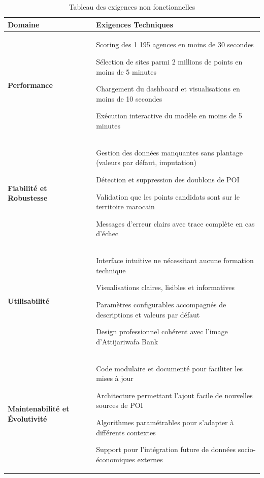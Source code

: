 \documentclass[11pt,a4paper,twoside]{report}
\begin{document}
\begingroup
\small
\renewcommand{\arraystretch}{1.1}
\begin{longtable}{|p{3.2cm}|p{10.8cm}|}
\caption{Tableau des exigences non fonctionnelles} \label{tab:enf} \\
\hline
\textbf{Domaine} & \textbf{Exigences Techniques} \\
\hline
\endfirsthead
\endhead
\hline
\endfoot
\hline
\endlastfoot

\textbf{Performance} &
\begin{tblitem}
    \item Scoring des 1 195 agences en moins de 30 secondes
    \item Sélection de sites parmi 2 millions de points en moins de 5 minutes
    \item Chargement du dashboard et visualisations en moins de 10 secondes
    \item Exécution interactive du modèle en moins de 5 minutes
\end{tblitem} \\
\hline

\textbf{Fiabilité et Robustesse} &
\begin{tblitem}
    \item Gestion des données manquantes sans plantage (valeurs par défaut, imputation)
    \item Détection et suppression des doublons de POI
    \item Validation que les points candidats sont sur le territoire marocain
    \item Messages d'erreur clairs avec trace complète en cas d'échec
\end{tblitem} \\
\hline

\textbf{Utilisabilité} &
\begin{tblitem}
    \item Interface intuitive ne nécessitant aucune formation technique
    \item Visualisations claires, lisibles et informatives
    \item Paramètres configurables accompagnés de descriptions et valeurs par défaut
    \item Design professionnel cohérent avec l'image d'Attijariwafa Bank
\end{tblitem} \\
\hline

\textbf{Maintenabilité et Évolutivité} &
\begin{tblitem}
    \item Code modulaire et documenté pour faciliter les mises à jour
    \item Architecture permettant l'ajout facile de nouvelles sources de POI
    \item Algorithmes paramétrables pour s'adapter à différents contextes
    \item Support pour l'intégration future de données socio-économiques externes
\end{tblitem} \\
\hline


\end{longtable}
\end{document}
